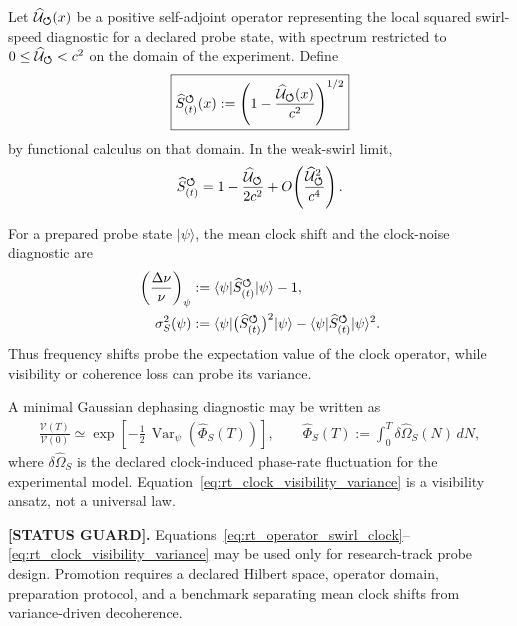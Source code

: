 Let $\widehat{\mathcal U}_{\boldsymbol{\circlearrowleft}}(x)$ be a positive self-adjoint operator representing the local squared swirl-speed diagnostic for a declared probe state, with spectrum restricted to $0\le \widehat{\mathcal U}_{\boldsymbol{\circlearrowleft}}<c^2$ on the domain of the experiment.  Define
\begin{align}
    \boxed{
    \widehat{S}_{(t)}^{\boldsymbol{\circlearrowleft}}(x)
    :=
    \left(
    1-\frac{\widehat{\mathcal U}_{\boldsymbol{\circlearrowleft}}(x)}{c^2}
    \right)^{1/2}
    }
    \label{eq:rt_operator_swirl_clock}
\end{align}
by functional calculus on that domain.  In the weak-swirl limit,
\begin{align}
    \widehat{S}_{(t)}^{\boldsymbol{\circlearrowleft}}
    =
    1-\frac{\widehat{\mathcal U}_{\boldsymbol{\circlearrowleft}}}{2c^2}
    +O\!\left(\frac{\widehat{\mathcal U}_{\boldsymbol{\circlearrowleft}}^{2}}{c^4}\right).
    \label{eq:rt_operator_swirl_clock_weak}
\end{align}

For a prepared probe state $|\psi\rangle$, the mean clock shift and the clock-noise diagnostic are
\begin{align}
    \left(\frac{\Delta\nu}{\nu}\right)_{\psi}
    &:=
    \langle\psi|\widehat{S}_{(t)}^{\boldsymbol{\circlearrowleft}}|\psi\rangle-1,
    \label{eq:rt_operator_clock_mean_shift}
    \\
    \sigma_{S}^{2}(\psi)
    &:={}
    \langle\psi|\big(\widehat{S}_{(t)}^{\boldsymbol{\circlearrowleft}}\big)^2|\psi\rangle
    -
    \langle\psi|\widehat{S}_{(t)}^{\boldsymbol{\circlearrowleft}}|\psi\rangle^2 .
    \label{eq:rt_operator_clock_variance}
\end{align}
Thus frequency shifts probe the expectation value of the clock operator, while visibility or coherence loss can probe its variance.

A minimal Gaussian dephasing diagnostic may be written as
\begin{align}
    \frac{\mathcal V(T)}{\mathcal V(0)}
    \simeq
    \exp\!\left[-\frac12\,\operatorname{Var}_{\psi}\!\left(\widehat{\Phi}_{S}(T)\right)\right],
    \qquad
    \widehat{\Phi}_{S}(T)
    :=
    \int_{0}^{T}\delta\widehat{\Omega}_{S}(N)\,dN,
    \label{eq:rt_clock_visibility_variance}
\end{align}
where $\delta\widehat{\Omega}_{S}$ is the declared clock-induced phase-rate fluctuation for the experimental model.  Equation~\eqref{eq:rt_clock_visibility_variance} is a visibility ansatz, not a universal law.

\textbf{[STATUS GUARD].}
Equations~\eqref{eq:rt_operator_swirl_clock}--\eqref{eq:rt_clock_visibility_variance} may be used only for research-track probe design.  Promotion requires a declared Hilbert space, operator domain, preparation protocol, and a benchmark separating mean clock shifts from variance-driven decoherence.

